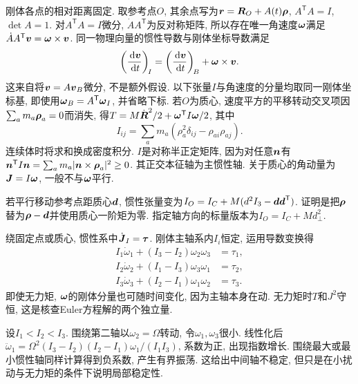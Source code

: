 刚体各点的相对距离固定. 取参考点$O$, 其余点写为$\boldsymbol{r}=\boldsymbol{R}_O+A(t)\boldsymbol{\rho}$, $A^{\mathsf T}A=I$, $\det A=1$. 对$A^{\mathsf T}A=I$微分, $\dot A A^{\mathsf T}$为反对称矩阵, 所以存在唯一角速度$\boldsymbol{\omega}$满足$\dot A A^{\mathsf T}\boldsymbol{v}=\boldsymbol{\omega}\times\boldsymbol{v}$. 同一物理向量的惯性导数与刚体坐标导数满足
\[
\left(\frac{\,\mathrm d\boldsymbol{v}}{\,\mathrm d t}\right)_{\!I}
=\left(\frac{\,\mathrm d\boldsymbol{v}}{\,\mathrm d t}\right)_{\!B}+\boldsymbol{\omega}\times\boldsymbol{v}.
\]
这来自将$\boldsymbol{v}=A\boldsymbol{v}_B$微分, 不是额外假设. 以下张量$I$与角速度的分量均取同一刚体坐标基, 即使用$\boldsymbol{\omega}_B=A^{\mathsf T}\boldsymbol{\omega}_I$, 并省略下标. 若$O$为质心, 速度平方的平移转动交叉项因$\sum_am_a\boldsymbol{\rho}_a=0$而消失, 得$T=M\dot{\boldsymbol{R}}^2/2+\boldsymbol{\omega}^{\mathsf T}I\boldsymbol{\omega}/2$, 其中
\[
I_{ij}=\sum_a m_a(\rho_a^2\delta_{ij}-\rho_{ai}\rho_{aj}).
\]
连续体时将求和换成密度积分. $I$是对称半正定矩阵, 因为对任意$\boldsymbol{n}$有$\boldsymbol{n}^{\mathsf T}I\boldsymbol{n}=\sum_am_a|\boldsymbol{n}\times\boldsymbol{\rho}_a|^2\ge0$. 其正交本征轴为主惯性轴. 关于质心的角动量为$\boldsymbol{J}=I\boldsymbol{\omega}$, 一般不与$\boldsymbol{\omega}$平行.

若平行移动参考点距质心$\boldsymbol{d}$, 惯性张量变为$I_O=I_C+M(d^2I_3-\boldsymbol{d}\boldsymbol{d}^{\mathsf T})$. 证明是把$\boldsymbol{\rho}$替为$\boldsymbol{\rho}-\boldsymbol{d}$并使用质心一阶矩为零. 指定轴方向的标量版本为$I_O=I_C+Md_\perp^2$.

绕固定点或质心, 惯性系中$\dot{\boldsymbol{J}}_I=\boldsymbol{\tau}$. 刚体主轴系内$I_i$恒定, 运用导数变换得
\begin{align*}
I_1\dot\omega_1+(I_3-I_2)\omega_2\omega_3&=\tau_1,\\
I_2\dot\omega_2+(I_1-I_3)\omega_3\omega_1&=\tau_2,\\
I_3\dot\omega_3+(I_2-I_1)\omega_1\omega_2&=\tau_3.
\end{align*}
即使无力矩, $\boldsymbol{\omega}$的刚体分量也可随时间变化, 因为主轴本身在动. 无力矩时$T$和$J^2$守恒, 这是核查Euler方程解的两个独立量.

设$I_1<I_2<I_3$. 围绕第二轴以$\omega_2=\Omega$转动, 令$\omega_1,\omega_3$很小. 线性化后$\ddot\omega_1=\Omega^2(I_3-I_2)(I_2-I_1)\omega_1/(I_1I_3)$, 系数为正, 出现指数增长. 围绕最大或最小惯性轴同样计算得到负系数, 产生有界振荡. 这给出中间轴不稳定, 但只是在小扰动与无力矩的条件下说明局部稳定性.



